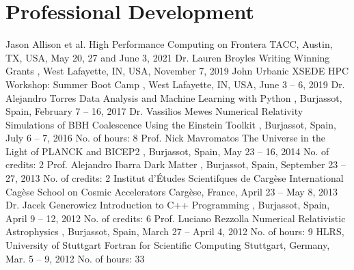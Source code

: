 \section{Professional Development}

%
{Jason Allison et al.}%
{High Performance Computing on Frontera}%
{}%
{TACC, Austin, TX, USA, May 20, 27 and June 3, 2021}%
{}
%
{Dr. Lauren Broyles}%
{Writing Winning Grants}%
{}%
{\Purdue, West Lafayette, IN, USA, November 7, 2019}%
{}
%
{John Urbanic}%
{XSEDE HPC Workshop: Summer Boot Camp}%
{}%
{\Purdue, West Lafayette, IN, USA, June 3 -- 6, 2019}%
{}
%
{Dr. Alejandro Torres}%
{Data Analysis and Machine Learning with Python}%
{}%
{\UVval, Burjassot, Spain, February 7 -- 16, 2017}%
{}
%
{Dr. Vassilios Mewes}%
{Numerical Relativity Simulations of BBH Coalescence Using the Einstein Toolkit}%
{}%
{\UVval, Burjassot, Spain, July 6 -- 7, 2016}%
{No. of hours: 8}
%
{Prof. Nick Mavromatos}%
{The Universe in the Light of PLANCK and BICEP2}%
{}%
{\UVval, Burjassot, Spain, May 23 -- 16, 2014}%
{No. of credits: 2}
%
{Prof. Alejandro Ibarra}%
{Dark Matter}%
{}%
{\UVval, Burjassot, Spain, September 23 -- 27, 2013}
{No. of credits: 2}
%
{Institut d'Études Scientifques de Cargèse}%
{International Cagèse School on Cosmic Accelerators}%
{}%
{Cargèse, France, April 23 -- May 8, 2013}%
{}
%
{Dr. Jacek Generowicz}%
{Introduction to C++ Programming}%
{}%
{\UVval, Burjassot, Spain, April 9 -- 12, 2012}%
{No. of credits: 6}
%
{Prof. Luciano Rezzolla}%
{Numerical Relativistic Astrophysics}%
{}%
{\UVval, Burjassot, Spain, March 27 -- April 4, 2012}%
{No. of hours: 9}
%
{HLRS, University of Stuttgart}%
{Fortran for Scientific Computing}%
{}%
{Stuttgart, Germany, Mar. 5 -- 9, 2012}%
{No. of hours: 33}
